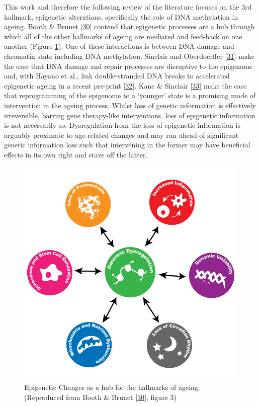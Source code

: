 \documentclass[
]{book}
\begin{document}
This work and therefore the following review of the literature focuses on the 3rd hallmark, epigenetic alterations, specifically the role of DNA methylation in ageing.
Booth \& Brunet {[}\protect\hyperlink{ref-Booth2016}{30}{]} contend that epigenetic processes are a hub through which all of the other hallmarks of ageing are mediated and feed-back on one another (Figure \ref{fig:Booth2016fig3}).
One of these interactions is between DNA damage and chromatin state including DNA methylation.
Sinclair and Oberdoerffer {[}\protect\hyperlink{ref-Sinclair2009}{31}{]} make the case that DNA damage and repair processes are disruptive to the epigenome and, with Hayano et al., link double-stranded DNA breaks to accelerated epigenetic ageing in a recent pre-print {[}\protect\hyperlink{ref-Hayano2019}{32}{]}.
Kane \& Sinclair {[}\protect\hyperlink{ref-Kane2019}{33}{]} make the case that reprogramming of the epigenome to a `younger' state is a promising mode of intervention in the ageing process.
Whilst loss of genetic information is effectively irreversible, barring gene therapy-like interventions, loss of epigenetic information is not necessarily so.
Dysregulation from the loss of epigenetic information is arguably proximate to age-related changes and may run ahead of significant genetic information loss such that intervening in the former may have beneficial effects in its own right and stave off the latter.

\begin{figure}

{\centering \includegraphics[width=0.6\linewidth]{figs/Booth2016_F3_epigenomeHubAgingHallmarks_alpha} 

}

\caption{Epigenetic Changes as a hub for the hallmarks of ageing. (Reproduced from Booth \& Brunet {[}\protect\hyperlink{ref-Booth2016}{30}{]}, figure 3)}\label{fig:Booth2016fig3}
\end{figure}
\end{document}
